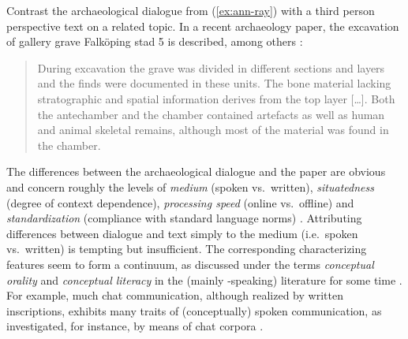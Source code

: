 \documentclass[output=paper,biblatex,babelshorthands,newtxmath,draftmode,colorlinks,citecolor=brown]{langscibook}
\begin{document}
\noindent
Contrast the archaeological dialogue from (\ref{ex:ann-ray}) with a third person perspective text on a related topic.
%
In a recent archaeology paper, the excavation of gallery grave Falköping stad 5 is described, among others \citep[]{Blank:Tornberg:Knipper:2018}:
%
\begin{quote}
During excavation the grave was divided in different sections and layers and the finds were documented in these units. The bone material lacking stratographic and spatial information derives from the top layer [\ldots]. Both the antechamber and the chamber contained artefacts as well as human and animal skeletal remains, although most of the material was found in the chamber.
\end{quote}

\noindent
The differences between the archaeological dialogue and the paper are obvious and concern roughly the levels of \emph{medium} (spoken vs.\ written), \emph{situatedness} (degree of context dependence), \emph{processing speed} (online vs.\ offline) and \emph{standardization} (compliance with standard language norms) \citep{Klein:1985}.
%
Attributing differences between dialogue and text simply to the medium (i.e.\ spoken vs.\ written) is tempting but insufficient. 
%
The corresponding characterizing features seem to form a continuum, as discussed under the terms \emph{conceptual orality} and \emph{conceptual literacy} in the (mainly -speaking) literature for some time \citep{Koch:Oesterreicher:1985}.
%
For example, much chat communication, although realized by written inscriptions, exhibits many traits of (conceptually) spoken communication, as investigated, for instance, by means of chat corpora \citep{Beisswenger:et:al:2012:a}. 
%
\end{document}
